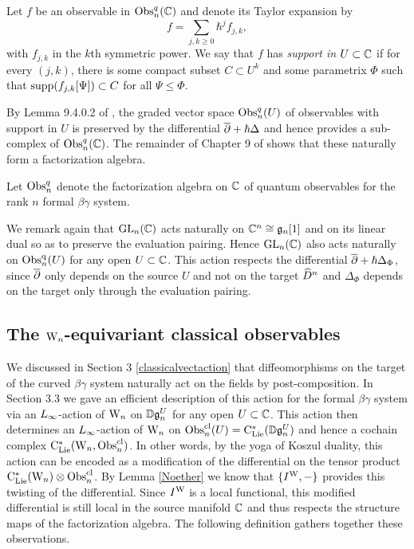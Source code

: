 \begin{dfn}
Let $f$ be an observable in ${\rm Obs}^q_n(\mathbb C)$ and denote its Taylor expansion by
\[
f = \sum_{j,k \geq 0} \hbar^j f_{j,k},
\]
with $f_{j,k}$ in the $k$th symmetric power. 
We say that $f$ has \emph{support in $U \subset \mathbb C$} if 
for every $(j,k)$, there is some compact subset $C \subset U^k$ and some parametrix $\Phi$
such that ${\rm supp}(f_{j,k}[\Psi]) \subset C$ for all $\Psi \leq \Phi$.
\end{dfn}

By Lemma 9.4.0.2 of \cite{CG2}, the graded vector space ${\rm Obs}^q_n(U)$ of observables with support in $U$
is preserved by the differential $\overline{\partial} + \hbar \Delta$ and hence provides a sub-complex of ${\rm Obs}^q_n(\mathbb C)$.
The remainder of Chapter 9 of \cite{CG2} shows that these naturally form a factorization algebra.

\begin{dfn}\label{noneq quantum obs}
Let ${\rm Obs}^q_n$ denote the factorization algebra on $\mathbb C$ of quantum observables for the rank $n$ formal $\beta\gamma$ system.
\end{dfn}

We remark again that ${\rm GL}_n(\mathbb C)$ acts naturally on $\mathbb C^n \cong \mathfrak{g}_n[1]$
and on its linear dual so as to preserve the evaluation pairing.
Hence ${\rm GL}_n(\mathbb C)$ also acts naturally on ${\rm Obs}^{\rm q}_n(U)$ for any open $U \subset \mathbb C$.
This action respects the differential $\overline{\partial} + \hbar \Delta_\Phi$, 
since $\overline{\partial}$ only depends on the source $U$ and not on the target $\widehat{D}^n$
and $\Delta_\Phi$ depends on the target only through the evaluation pairing.

\subsection{The ${{\rm W}_n}$-equivariant classical observables}

We discussed in Section 3 \ref{classicalvectaction} that 
diffeomorphisms on the target of the curved $\beta\gamma$ system 
naturally act on the fields by post-composition.
In Section 3.3 we gave an efficient description of this action for the formal $\beta\gamma$ system
via an $\L8$-action of ${{\rm W}_n}$ on $\mathbb D\mathfrak{g}_n^U$ for any open $U \subset \mathbb C$.
This action then determines an $\L8$-action of ${{\rm W}_n}$ on ${\rm Obs}^{\rm cl}_n(U) = {\rm C}_{\rm Lie}^*(\mathbb D\mathfrak{g}_n^U)$
and hence a cochain complex ${\rm C}_{\rm Lie}^*({{\rm W}_n},{\rm Obs}^{\rm cl}_n)$.
In other words, by the yoga of Koszul duality, 
this action can be encoded as a modification of the differential on the tensor product ${\rm C}_{\rm Lie}^*({{\rm W}_n}) \otimes {\rm Obs}^{\rm cl}_n$.
By Lemma \ref{Noether} we know that $\{I^{\rm W},-\}$ provides this twisting of the differential.
Since $I^{\rm W}$ is a local functional, this modified differential is still local in the source manifold $\mathbb C$
and thus respects the structure maps of the factorization algebra.
The following definition gathers together these observations.

